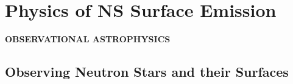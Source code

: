 


\section{Physics of NS Surface Emission}







\begin{frame}
\begin{center}
 
	{\bf  OBSERVATIONAL ASTROPHYSICS} 
\end{center}

\end{frame}


\subsection*{Observing Neutron Stars and their Surfaces} 

